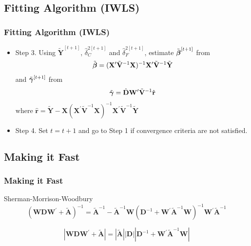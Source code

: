 \documentclass[mathserif,compress]{beamer}
\def\bit{\begin{itemize}}
\def\eit{\end{itemize}}
\def\bdm{\begin{displaymath}}
\def\edm{\end{displaymath}}
\def\br{\mathbf{r}}
\def\bA{\mathbf{A}}
\def\bD{\mathbf{D}}
\def\bV{\mathbf{V}}
\def\bW{\mathbf{W}}
\def\bX{\mathbf{X}}
\def\bY{\mathbf{Y}}
\def\bbeta{\mbox{\boldmath $\beta$}}
\def\bgamma{\mbox{\boldmath $\gamma$}}
\begin{document}
\subsection{Fitting Algorithm (IWLS)}
\begin{frame} 
\frametitle{Fitting Algorithm (IWLS)}
     
	\begin{center}
	\bit
		\item Step 3.  Using $\tilde{\bY}^{[t+1]}$, $\hat{\delta}_C^{2[t+1]}$ and 
			$\hat{\delta}_F^{2[t+1]}$, estimate $\tilde{\bbeta}^{[t+1]}$ from
			\bdm
				\tilde{\bbeta} = (\bX^{\prime}\tilde{\bV}^{-1}\bX)^{-1}
					\bX^{\prime}\tilde{\bV}^{-1}\tilde{\bY}		
			\edm 
			and $\tilde{\bgamma}^{[t+1]}$ from
			\bdm
				\tilde{\bgamma} = \hat{\bD}\bW^\prime\tilde{\bV}^{-1}\hat{\br}
			\edm 
			$\textrm{where }\hat{\br} = \tilde{\bY} - \bX(\bX^{\prime}\tilde{\bV}^{-1}\bX)^{-1}
					\bX^{\prime}\tilde{\bV}^{-1}\tilde{\bY}$  \pause
		\item Step 4. Set $t = t + 1$ and go to Step 1 if convergence criteria 
			are not satisfied.
	\eit
	\end{center}

\end{frame}


\subsection{Making it Fast}
\begin{frame} 
\frametitle{Making it Fast}

	Sherman-Morrison-Woodbury
	\bdm
		(\bW\bD\bW^{\prime} + \tilde{\bA})^{-1} = 
			\tilde{\bA}^{-1} - \tilde{\bA}^{-1}\bW(\bD^{-1} + 
			\bW^{\prime}\tilde{\bA}^{-1}\bW)^{-1}\bW^{\prime}\tilde{\bA}^{-1}
	\edm \pause

	\bdm
		|\bW\bD\bW^{\prime} + \tilde{\bA}| = |\tilde{\bA}| 
			|\bD||\bD^{-1} + \bW^{\prime}\tilde{\bA}^{-1}\bW|
	\edm     

\end{frame}

 
\end{document}
